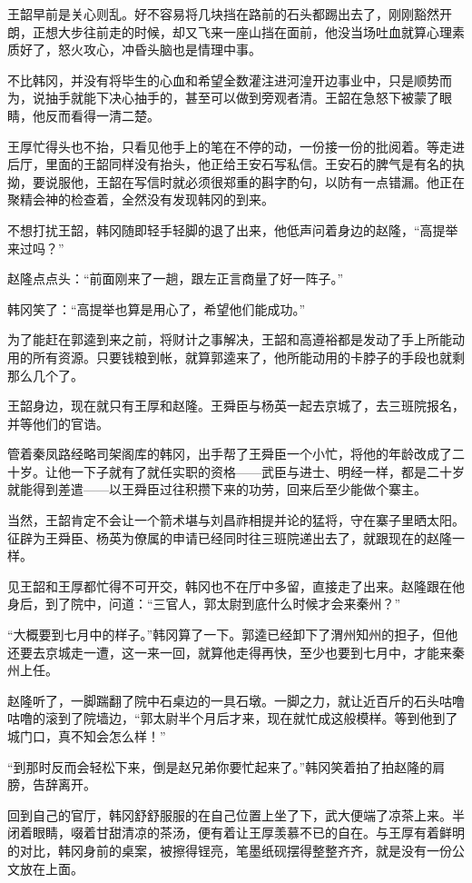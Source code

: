 王韶早前是关心则乱。好不容易将几块挡在路前的石头都踢出去了，刚刚豁然开朗，正想大步往前走的时候，却又飞来一座山挡在面前，他没当场吐血就算心理素质好了，怒火攻心，冲昏头脑也是情理中事。

不比韩冈，并没有将毕生的心血和希望全数灌注进河湟开边事业中，只是顺势而为，说抽手就能下决心抽手的，甚至可以做到旁观者清。王韶在急怒下被蒙了眼睛，他反而看得一清二楚。

王厚忙得头也不抬，只看见他手上的笔在不停的动，一份接一份的批阅着。等走进后厅，里面的王韶同样没有抬头，他正给王安石写私信。王安石的脾气是有名的执拗，要说服他，王韶在写信时就必须很郑重的斟字酌句，以防有一点错漏。他正在聚精会神的检查着，全然没有发现韩冈的到来。

不想打扰王韶，韩冈随即轻手轻脚的退了出来，他低声问着身边的赵隆，“高提举来过吗？”

赵隆点点头：“前面刚来了一趟，跟左正言商量了好一阵子。”

韩冈笑了：“高提举也算是用心了，希望他们能成功。”

为了能赶在郭逵到来之前，将财计之事解决，王韶和高遵裕都是发动了手上所能动用的所有资源。只要钱粮到帐，就算郭逵来了，他所能动用的卡脖子的手段也就剩那么几个了。

王韶身边，现在就只有王厚和赵隆。王舜臣与杨英一起去京城了，去三班院报名，并等他们的官诰。

管着秦凤路经略司架阁库的韩冈，出手帮了王舜臣一个小忙，将他的年龄改成了二十岁。让他一下子就有了就任实职的资格——武臣与进士、明经一样，都是二十岁就能得到差遣——以王舜臣过往积攒下来的功劳，回来后至少能做个寨主。

当然，王韶肯定不会让一个箭术堪与刘昌祚相提并论的猛将，守在寨子里晒太阳。征辟为王舜臣、杨英为僚属的申请已经同时往三班院递出去了，就跟现在的赵隆一样。

见王韶和王厚都忙得不可开交，韩冈也不在厅中多留，直接走了出来。赵隆跟在他身后，到了院中，问道：“三官人，郭太尉到底什么时候才会来秦州？”

“大概要到七月中的样子。”韩冈算了一下。郭逵已经卸下了渭州知州的担子，但他还要去京城走一遭，这一来一回，就算他走得再快，至少也要到七月中，才能来秦州上任。

赵隆听了，一脚踹翻了院中石桌边的一具石墩。一脚之力，就让近百斤的石头咕噜咕噜的滚到了院墙边，“郭太尉半个月后才来，现在就忙成这般模样。等到他到了城门口，真不知会怎么样！”

“到那时反而会轻松下来，倒是赵兄弟你要忙起来了。”韩冈笑着拍了拍赵隆的肩膀，告辞离开。

回到自己的官厅，韩冈舒舒服服的在自己位置上坐了下，武大便端了凉茶上来。半闭着眼睛，啜着甘甜清凉的茶汤，便有着让王厚羡慕不已的自在。与王厚有着鲜明的对比，韩冈身前的桌案，被擦得锃亮，笔墨纸砚摆得整整齐齐，就是没有一份公文放在上面。

